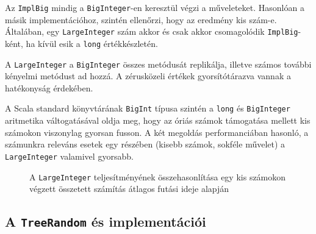 \documentclass[
    parspace,
    noindent,
    nohyp,
]{elteiktdk}[2023/04/10]
\begin{document}
Az \texttt{ImplBig} mindig a \texttt{BigInteger}-en keresztül végzi a műveleteket.
Hasonlóan a másik implementációhoz, szintén ellenőrzi, hogy az eredmény kis szám-e.
Általában, egy \texttt{LargeInteger} szám akkor és csak akkor csomagolódik \texttt{ImplBig}-ként,
ha kívül esik a \texttt{long} értékkészletén.

A \texttt{LargeInteger} a \texttt{BigInteger} összes metódusát replikálja,
illetve számos további kényelmi metódust ad hozzá.
A zérusközeli értékek gyorsítótárazva vannak a hatékonyság érdekében.

A Scala standard könyvtárának \texttt{BigInt} típusa szintén a \texttt{long} és \texttt{BigInteger}
aritmetika váltogatásával oldja meg,
hogy az óriás számok támogatása mellett kis számokon viszonylag gyorsan fusson.
A két megoldás performanciában hasonló,
a számunkra releváns esetek egy részében (kisebb számok, sokféle művelet)
a \texttt{LargeInteger} valamivel gyorsabb.

\begin{figure}[H]
    \centering
    \caption[A \texttt{LargeInteger} teljesítményének összevetése]{
        A \texttt{LargeInteger} teljesítményének összehasonlítása
        egy kis számokon végzett összetett számítás átlagos futási ideje alapján
    }
\end{figure}

\subsection{A \texttt{TreeRandom} és implementációi}
\end{document}
